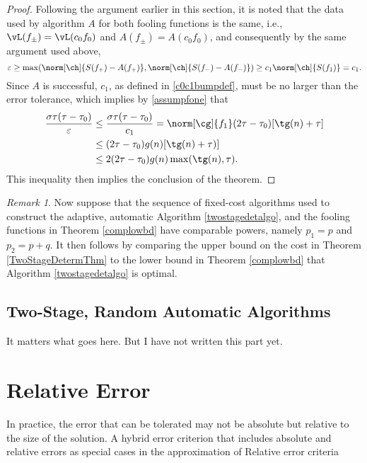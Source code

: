 \documentclass[final]{elsarticle}
\theoremstyle{definition}
\theoremstyle{remark}
\newtheorem{rem}{Remark}
\begin{document}
\begin{proof}
Following the argument earlier in this section, it is noted that the data used by algorithm $A$ for both fooling functions is the same, i.e., $\vL(f_{\pm})=\vL(c_0f_0)$ and  $A(f_{\pm})=A(c_0f_0)$, and consequently by the same argument used above, 
\[
\varepsilon  \ge  \max(\norm[\ch]{S(f_+)-A(f_+)},\norm[\ch]{S(f_-)-A(f_-)}) \ge c_1 \norm[\ch]{S(f_1)}=c_1.
\]
Since $A$ is successful, $c_1$, as defined in \eqref{c0c1bumpdef}, must be no larger than the error tolerance, which implies by \eqref{assumpfone} that 
\begin{align*}
\frac{\sigma \tau(\tau-\tau_0)}{\varepsilon} & \le \frac{\sigma \tau(\tau-\tau_0)}{c_1}  = \norm[\cg]{f_1} (2\tau - \tau_0) [\tg(n) + \tau] \\
&\le (2\tau - \tau_0) g(n) [\tg(n) + \tau)] \\
&\le 2 (2\tau - \tau_0) g(n)\max( \tg(n), \tau).
\end{align*}
This inequality then implies the conclusion of the theorem.   
\end{proof}

\begin{rem} Now suppose that the sequence of fixed-cost algorithms used to construct the adaptive, automatic Algorithm \ref{twostagedetalgo}, and the fooling functions in Theorem \ref{complowbd} have comparable powers, namely $p_1=p$ and $p_2=p+q$.  It then follows by comparing the upper bound on the cost in Theorem \ref{TwoStageDetermThm} to the lower bound in Theorem \ref{complowbd} that Algorithm \ref{twostagedetalgo} is optimal. 
\end{rem}


\subsection{Two-Stage, Random Automatic Algorithms}
It matters what goes here. But I have not written this part yet.


\section{Relative Error} \label{relerrsec} In practice, the error that can be tolerated may not be absolute but relative to the size of the solution.  A hybrid error criterion that includes absolute and relative errors as special cases  in the approximation of Relative error criteria
\end{document}
